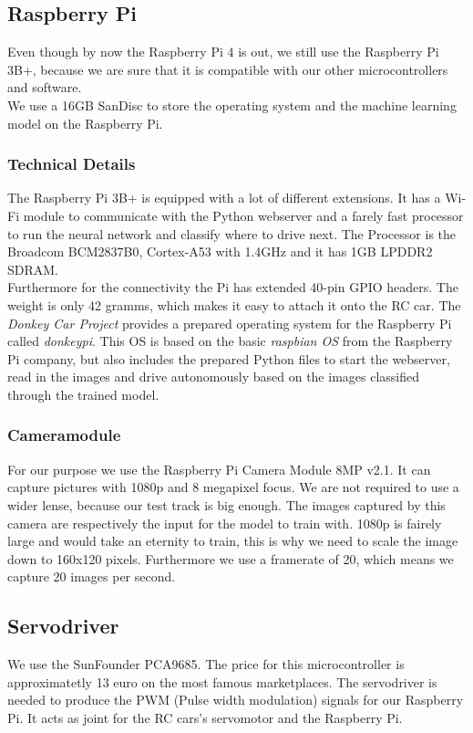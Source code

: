 \documentclass[journal]{IEEEtran}
\begin{document}
\subsection{Raspberry Pi}
Even though by now the Raspberry Pi 4 is out, we still use the Raspberry Pi 3B+, because we are sure that it is compatible with our other microcontrollers and software. \\
We use a 16GB SanDisc to store the operating system and the machine learning model on the Raspberry Pi. \\

\subsubsection{Technical Details}
The Raspberry Pi 3B+ is equipped with a lot of different extensions. It has a Wi-Fi module to communicate with the Python webserver and a farely fast processor to run the neural network and classify where to drive next. The Processor is the Broadcom BCM2837B0, Cortex-A53 with 1.4GHz and it has 1GB LPDDR2 SDRAM. \\
Furthermore for the connectivity the Pi has extended 40-pin GPIO headers. The weight is only 42 gramms, which makes it easy to attach it onto the RC car. The \textit{Donkey Car Project} \cite{donkey} provides a prepared operating system for the Raspberry Pi called \textit{donkeypi}. This OS is based on the basic \textit{raspbian OS} from the Raspberry Pi company, but also includes the prepared Python files to start the webserver, read in the images and drive autonomously based on the images classified through the trained model. \\

\subsubsection{Cameramodule}
For our purpose we use the Raspberry Pi Camera Module 8MP v2.1. It can capture pictures with 1080p and 8 megapixel focus. We are not required to use a wider lense, because our test track is big enough. The images captured by this camera are respectively the input for the model to train with. 1080p is fairely large and would take an eternity to train, this is why we need to scale the image down to 160x120 pixels. Furthermore we use a framerate of 20, which means we capture 20 images per second.  

\subsection{Servodriver}
We use the SunFounder PCA9685. The price for this microcontroller is approximatetly 13 euro on the most famous marketplaces. The servodriver is needed to produce the PWM (Pulse width modulation) signals for our Raspberry Pi. It acts as joint for the RC cars's servomotor and the Raspberry Pi. \\
\end{document}
